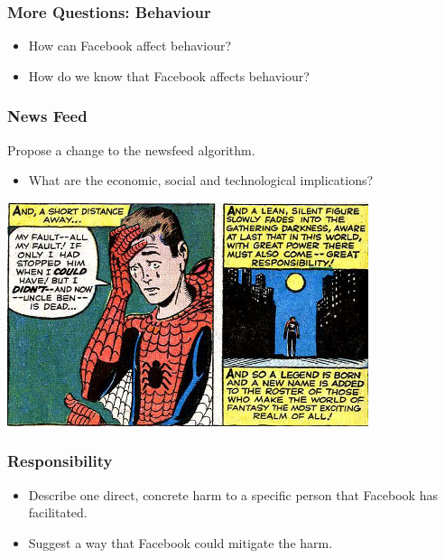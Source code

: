 \documentclass{beamer}
\begin{document}
\begin{frame}
\frametitle{More Questions: Behaviour}
\begin{itemize}
\item How can Facebook affect behaviour?
\item How do we know that Facebook affects behaviour?
\end{itemize}
\end{frame}

\begin{frame}
\frametitle{News Feed}
Propose a change to the newsfeed algorithm.
\begin{itemize}
\item What are the economic, social and technological implications?
\end{itemize}
\end{frame}

\begin{frame}
\begin{center}
\includegraphics{images/spider400.jpg}
\end{center}
\end{frame}

\begin{frame}
\frametitle{Responsibility}

\begin{itemize}
\item Describe one direct, concrete harm to a specific person that Facebook has facilitated.
\item Suggest a way that Facebook could mitigate the harm.
\end{itemize}
\end{frame}
\end{document}

